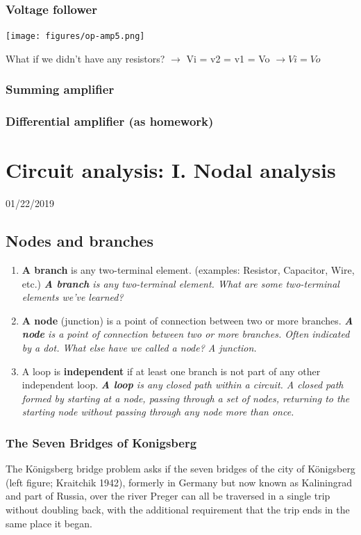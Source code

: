 \documentclass[11pt]{book}
\begin{document}
\subsection{Voltage follower}
\texttt{[image: figures/op-amp5.png]}

What if we didn’t have any resistors? $\rightarrow$ Vi = v2 = v1 = Vo $\rightarrow Vi = Vo$


\subsection{Summing amplifier}
\subsection{Differential amplifier (as homework)}



\chapter{Circuit analysis: I. Nodal analysis}
01/22/2019
\minitoc
\newpage
\section{Nodes and branches}
\begin{enumerate}
	\item \textbf{A branch} is any two-terminal element. (examples: Resistor, Capacitor, Wire, etc.) 
	\subitem \textit{\textbf{A branch} is any two-terminal element. What are some two-terminal elements we’ve learned?}
	\item \textbf{A node} (junction) is a point of connection between two or more branches. 
	\subitem \textit{\textbf{A node} is a point of connection between two or more branches. Often indicated by a dot. What else have we called a node? A junction.}
	\item A loop is \textbf{independent} if at least one branch is not part of any other independent loop. 
	\subitem \textit{\textbf{A loop} is any closed path within a circuit. A closed path formed by starting at a node, passing through a set of nodes, returning to the starting node without passing through any node more than once.}
\end{enumerate}

\subsection{The Seven Bridges of Konigsberg}
The Königsberg bridge problem asks if the seven bridges of the city of Königsberg (left figure; Kraitchik 1942), formerly in Germany but now known as Kaliningrad and part of Russia, over the river Preger can all be traversed in a single trip without doubling back, with the additional requirement that the trip ends in the same place it began.
\end{document}
